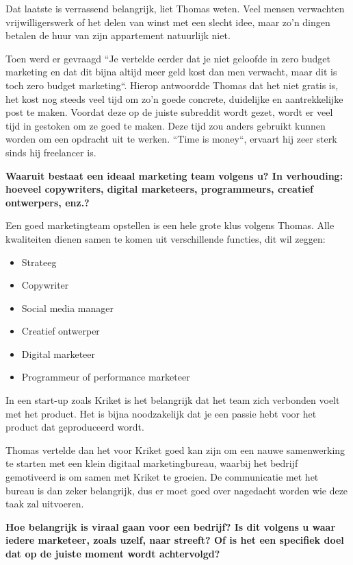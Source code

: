 Dat laatste is verrassend belangrijk, liet Thomas weten. Veel mensen verwachten vrijwilligerswerk of het delen van winst met een slecht idee, maar zo'n dingen betalen de huur van zijn appartement natuurlijk niet.

Toen werd er gevraagd ``Je vertelde eerder dat je niet geloofde in zero budget marketing en dat dit bijna altijd meer geld kost dan men verwacht, maar dit is toch zero budget marketing``. Hierop antwoordde Thomas dat het niet gratis is, het kost nog steeds veel tijd om zo'n goede concrete, duidelijke en aantrekkelijke post te maken. Voordat deze op de juiste subreddit wordt gezet, wordt er veel tijd in gestoken om ze goed te maken. Deze tijd zou anders gebruikt kunnen worden om een opdracht uit te werken. ``Time is money``, ervaart hij zeer sterk sinds hij freelancer is.
	
\textbf{Waaruit bestaat een ideaal marketing team volgens u? In verhouding: hoeveel copywriters, digital marketeers, programmeurs, creatief ontwerpers, enz.?}
	
Een goed marketingteam opstellen is een hele grote klus volgens Thomas. Alle kwaliteiten dienen samen te komen uit verschillende functies, dit wil zeggen:

\begin{itemize} 
	\item Strateeg
	\item Copywriter
	\item Social media manager
	\item Creatief ontwerper
	\item Digital marketeer
	\item Programmeur of performance marketeer
\end{itemize} 

In een start-up zoals Kriket is het belangrijk dat het team zich verbonden voelt met het product. Het is bijna noodzakelijk dat je een passie hebt voor het product dat geproduceerd wordt.

Thomas vertelde dan het voor Kriket goed kan zijn om een nauwe samenwerking te starten met een klein digitaal marketingbureau, waarbij het bedrijf gemotiveerd is om samen met Kriket te groeien. De communicatie met het bureau is dan zeker belangrijk, dus er moet goed over nagedacht worden wie deze taak zal uitvoeren.
	
\textbf{Hoe belangrijk is viraal gaan voor een bedrijf? Is dit volgens u waar iedere marketeer, zoals uzelf, naar streeft? Of is het een specifiek doel dat op de juiste moment wordt achtervolgd?}
	
